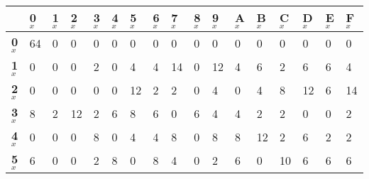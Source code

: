 \begin{longtable}[c]{|l|l|l|l|l|l|l|l|l|l|l|l|l|l|l|l|l|}
\hline
                & \textbf{0$_x$} & \textbf{1$_x$} & \textbf{2$_x$} & \textbf{3$_x$} & \textbf{4$_x$} & \textbf{5$_x$} & \textbf{6$_x$} & \textbf{7$_x$} & \textbf{8$_x$} & \textbf{9$_x$} & \textbf{A$_x$} & \textbf{B$_x$} & \textbf{C$_x$} & \textbf{D$_x$} & \textbf{E$_x$} & \textbf{F$_x$} \\ \hline
\endfirsthead
%
\endhead
%
\textbf{0$_x$}  & 64             & 0              & 0              & 0              & 0              & 0              & 0              & 0              & 0              & 0              & 0              & 0              & 0              & 0              & 0              & 0              \\ \hline
\textbf{1$_x$}  & 0              & 0              & 0              & 2              & 0              & 4              & 4              & 14             & 0              & 12             & 4              & 6              & 2              & 6              & 6              & 4              \\ \hline
\textbf{2$_x$}  & 0              & 0              & 0              & 0              & 0              & 12             & 2              & 2              & 0              & 4              & 0              & 4              & 8              & 12             & 6              & 14             \\ \hline
\textbf{3$_x$}  & 8              & 2              & 12             & 2              & 6              & 8              & 6              & 0              & 6              & 4              & 4              & 2              & 2              & 0              & 0              & 2              \\ \hline
\textbf{4$_x$}  & 0              & 0              & 0              & 8              & 0              & 4              & 4              & 8              & 0              & 8              & 8              & 12             & 2              & 6              & 2              & 2              \\ \hline
\textbf{5$_x$}  & 6              & 0              & 0              & 2              & 8              & 0              & 8              & 4              & 0              & 2              & 6              & 0              & 10             & 6              & 6              & 6              \\ \hline

\end{longtable}
